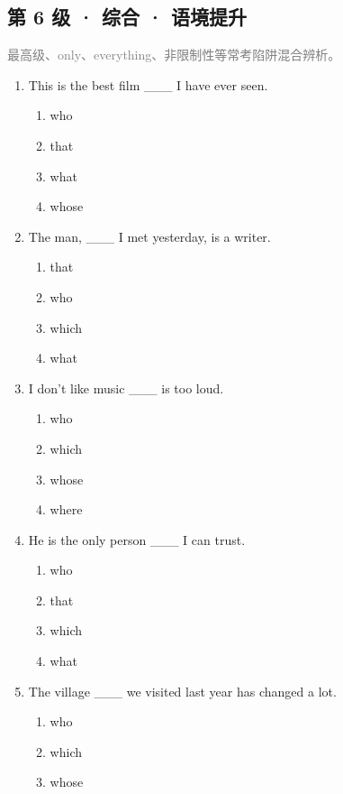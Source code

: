 \documentclass[11pt,a4paper]{ctexart}
\begin{document}
\subsection*{第 6 级 · 综合 · 语境提升}
\noindent\textcolor{gray}{最高级、only、everything、非限制性等常考陷阱混合辨析。}\par\smallskip
\begin{enumerate}[leftmargin=*,itemsep=4pt]
\item This is the best film \_\_\_ I have ever seen.
\begin{enumerate}[label=\Alph*.,leftmargin=2em,itemsep=1pt,topsep=2pt]
\item who
\item that
\item what
\item whose
\end{enumerate}
\item The man, \_\_\_ I met yesterday, is a writer.
\begin{enumerate}[label=\Alph*.,leftmargin=2em,itemsep=1pt,topsep=2pt]
\item that
\item who
\item which
\item what
\end{enumerate}
\item I don’t like music \_\_\_ is too loud.
\begin{enumerate}[label=\Alph*.,leftmargin=2em,itemsep=1pt,topsep=2pt]
\item who
\item which
\item whose
\item where
\end{enumerate}
\item He is the only person \_\_\_ I can trust.
\begin{enumerate}[label=\Alph*.,leftmargin=2em,itemsep=1pt,topsep=2pt]
\item who
\item that
\item which
\item what
\end{enumerate}
\item The village \_\_\_ we visited last year has changed a lot.
\begin{enumerate}[label=\Alph*.,leftmargin=2em,itemsep=1pt,topsep=2pt]
\item who
\item which
\item whose

\end{enumerate}
\end{enumerate}
\end{document}
